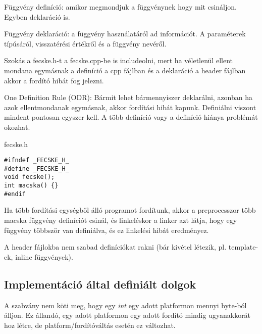 \documentclass[a4paper,11.5pt]{article}
\begin{document}
	\begin{definition}
		Függvény definíció: amikor megmondjuk a függvénynek hogy mit csináljon. Egyben deklaráció is.
	\end{definition}
	\begin{definition}
		Függvény deklaráció: a függvény használatáról ad információt. A paraméterek típúsáról, visszatérési értékről és a függvény nevéről.
  \end{definition}
	Szokás a fecske.h-t a fecske.cpp-be is includeolni, mert ha véletlenül ellent mondana egymásnak a definíció a cpp fájlban és a deklaráció a header fájlban akkor a fordító hibát fog jelezni.
	\begin{definition}
		One Definition Rule (ODR): Bármit lehet bármennyiszer deklarálni, azonban ha azok ellentmondanak egymásnak, akkor fordítási hibát kapunk. Definiálni viszont mindent pontosan egyszer kell. A több definíció vagy a definíció hiánya problémát okozhat.
	\end{definition}
	\begin{example}
		
		fecske.h
		\begin{lstlisting}
#ifndef _FECSKE_H_
#define _FECSKE_H_
void fecske();
int macska() {}
#endif
		\end{lstlisting}
		
		Ha több fordítási egységből álló programot fordítunk, akkor a preprocesszor több macska függvény definíciót csinál, és linkeléskor a linker azt látja, hogy egy függvény többször van definiálva, és ez linkelési hibát eredményez.
	\end{example}
	\begin{note}
		A header fájlokba nem szabad definíciókat rakni (bár kivétel létezik, pl. template-ek, inline függvények).
	\end{note}
	\subsection{Implementáció által definiált dolgok}
	A szabvány nem köti meg, hogy egy \textit{int} egy adott platformon mennyi byte-ból álljon. Ez állandó, egy adott platformon egy adott fordító mindig ugyanakkorát hoz létre, de platform/fordítóváltás esetén ez változhat.
\end{document}
